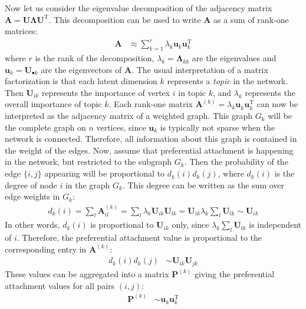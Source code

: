 \documentclass[11pt,a4paper]{book}
\newcommand{\syRank}{r}
\begin{document}
Now let us consider the eigenvalue decomposition of the adjacency matrix
$ \mathbf A = \mathbf U \mathbf \Lambda \mathbf U^{\mathrm T} $. 
This decomposition can be used to write $\mathbf A$ 
as a sum of rank-one matrices:
\begin{align*}
  \mathbf A &\approx \sum_{k=1}^\syRank \lambda_k^{\phantom{\mathrm I}} \mathbf
  u_k^{\phantom{\mathrm I}} \mathbf u_k^{\mathrm T}  
\end{align*}
where $\syRank$ is the rank of the decomposition, $\lambda_k = \mathbf
\Lambda_{kk}$ 
are the eigenvalues and $\mathbf u_k = \mathbf U_{\bullet k}$ are the
eigenvectors of $\mathbf A$. 
The usual interpretation of a matrix factorization is that each latent
dimension $k$ represents a \emph{topic} in the network.  Then $\mathbf
U_{ik}$ represents the importance of vertex $i$ in topic $k$, and
$\lambda_k$ represents the overall importance of topic $k$. 
Each rank-one matrix $\mathbf A^{(k)} = \lambda_k^{\phantom{\mathrm I}} \mathbf
u_k^{\phantom{\mathrm I}} \mathbf u_k^{\mathrm T}$ can
now be interpreted as the adjacency matrix of a weighted graph.  This
graph $G_k$ will be the complete graph on $n$ vertices, since $\mathbf u_k$ is
typically not sparse when the network is connected.  Therefore, all
information about this graph is 
contained in the weight of the edges.  
Now, assume that preferential attachment is happening in the network,
but restricted to the subgraph $G_k$.  Then the probability of the
edge $\{i,j\}$ appearing will be proportional to $d_k(i) d_k(j)$, where
$d_k(i)$ is the degree of node $i$ in the graph $G_k$.  This degree can
be written as the sum over edge weights in $G_k$:
\begin{align*}
  d_k(i) = \sum_l \mathbf A^{(k)}_{il} 
  = \sum_l \lambda_k \mathbf U_{ik} \mathbf U_{lk} 
  =  \mathbf U_{ik} \lambda_k \sum_l \mathbf U_{lk} 
  \sim \mathbf U_{ik}
\end{align*}
In other words, $d_k(i)$ is proportional to $\mathbf U_{ik}$ only, since
$\lambda_k \sum_l \mathbf U_{lk}$ is independent of $i$. 
Therefore, the preferential attachment value is proportional to the
corresponding entry in $\mathbf A^{(k)}$:
\begin{align*}
  d_k(i) d_k(j) &\sim \mathbf U_{ik} \mathbf U_{jk} 
\end{align*}
These values can be aggregated into a matrix $\mathbf P^{(k)}$ giving
the preferential 
attachment values for all pairs $(i,j)$:
\begin{align*}
  \mathbf P^{(k)} & \sim \mathbf u_k^{\phantom{\mathrm I}} \mathbf u_k^{\mathrm T}
\end{align*}
\end{document}
